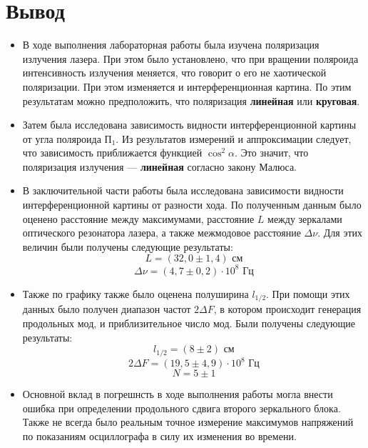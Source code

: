 \documentclass[a4paper,12pt]{article} %
\begin{document}
\section{Вывод}
\begin{itemize}
    \item В ходе выполнения лабораторная работы была изучена поляризация излучения лазера. При этом было установлено, что при вращении поляроида интенсивность излучения меняется, что говорит о его не хаотической поляризации. При этом изменяется и интерференционная картина. По этим результатам можно предположить, что поляризация \textbf{линейная} или \textbf{круговая}.
    \item Затем была исследована зависимость видности интерференционной картины от угла поляроида $ \text{П}_1 $. Из результатов измерений и аппроксимации следует, что зависимость приближается функцией $ \cos^2 \alpha $. Это значит, что поляризация излучения --- \textbf{линейная} согласно закону Малюса.
    \item В заключительной части работы была исследована зависимости видности интерференционной картины от разности хода. По полученным данным было оценено расстояние между максимумами, расстояние $ L $ между зеркалами оптического резонатора лазера, а также межмодовое расстояние $ \Delta\nu $. Для этих величин были получены следующие результаты:
    \[ \boxed{L = (32,0 \pm 1,4) \text{ см}} \]
    \[ \boxed{\Delta\nu = (4,7 \pm 0,2) \cdot 10^8 \text{ Гц}} \]
    \item Также по графику также было оценена полуширина $ l_{1/2} $. При помощи этих данных было получен диапазон частот $ 2\Delta F $, в котором происходит генерация продольных мод, и приблизительное число мод. Были получены следующие результаты:
    \[ \boxed{l_{1/2} = (8 \pm 2) \text{ см}} \]
    \[ \boxed{2\Delta F = (19,5 \pm 4,9)\cdot 10^8 \text{ Гц}} \]
    \[ \boxed{N = 5 \pm 1} \]
    \item Основной вклад в погрешнсть в ходе выполнения работы могла внести ошибка при определении продольного сдвига второго зеркального блока. Также не всегда было реальным точное измерение максимумов напряжений по показаниям осциллографа в силу их изменения во времени.
\end{itemize}
\end{document}
